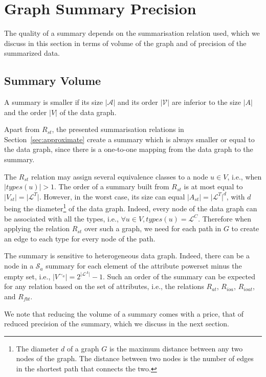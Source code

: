 \section{Graph Summary Precision}
\label{chap03:sec:quality}

The quality of a summary depends on the summarisation relation used, which we discuss in this section in terms of volume of the graph and of precision of the summarized data.

\subsection{Summary Volume}

A summary is smaller if its size $\vert \mathcal{A} \vert$ and its order $\vert \mathcal{V} \vert$ are inferior to the size $\vert A \vert$ and the order $\vert V \vert$ of the data graph.

Apart from $R_{st}$, the presented summarisation relations in Section~\ref{sec:approximate} create a summary which is always smaller or equal to the data graph, since there is a one-to-one mapping from the data graph to the summary.

The $R_{st}$ relation may assign several equivalence classes to a node $u \in V$, i.e., when $\vert types(u) \vert > 1$. The order of a summary built from $R_{st}$ is at most equal to $\vert V_{st} \vert = \vert \mathcal{L}^T \vert$. However, in the worst case, its size can equal $\vert A_{st} \vert = \vert \mathcal{L}^T \vert ^d$, with $d$ being the diameter\footnote{The diameter $d$ of a graph $G$ is the maximum distance between any two nodes of the graph. The distance between two nodes is the number of edges in the shortest path that connects the two.} of the data graph. Indeed, every node of the data graph can be associated with all the types, i.e., $\forall u \in V, types(u) = \mathcal{L}^C$. Therefore when applying the relation $R_{st}$ over such a graph, we need for each path in $G$ to create an edge to each type for every node of the path.

The summary is sensitive to heterogeneous data graph. Indeed, there can be a node in a $\mathcal{S}_a$ summary for each element of the attribute powerset minus the empty set, i.e., $\vert V^{\sim_a} \vert = 2^{\vert \mathcal{L}^A \vert} - 1$. Such an order of the summary can be expected for any relation based on the set of attributes, i.e., the relations $R_{at}$, $R_{ioa}$, $R_{ioat}$, and $R_{fbt}$.

We note that reducing the volume of a summary comes with a price, that of reduced precision of the summary, which we discuss in the next section.

